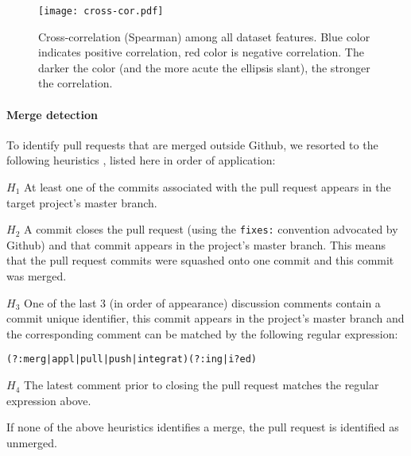 \documentclass{sig-alternate}
\begin{document}
\begin{figure}
  \begin{center}
    \texttt{[image: cross-cor.pdf]}
  \end{center}
  \caption{Cross-correlation (Spearman) among all dataset features. Blue color indicates positive correlation, red color is negative correlation. The darker
  the color (and the more acute the ellipsis slant), the stronger the correlation.}
  \label{fig:features}
\end{figure}



\paragraph*{Merge detection}
To identify pull requests that are merged outside Github, we resorted to
the following heuristics , listed here in order of application:

\begin{compactdesc}

  \item[$H_1$] At least one of the commits associated with the pull request appears in the target project's master branch.

  \item[$H_2$] A commit closes the pull request (using the \texttt{fixes:}
    convention advocated by Github) and that commit appears in the project's
    master branch.  This means that the pull request commits were squashed onto
    one commit and this commit was merged.

  \item[$H_3$] One of the last 3 (in order of appearance) discussion comments
    contain a commit unique identifier, this commit appears in the project's
    master branch and the corresponding comment can be matched by the following
    regular expression:

    \begin{small}
    \texttt{(?:merg|appl|pull|push|integrat)(?:ing|i?ed)}
    \end{small}

  \item[$H_4$] The latest comment prior to closing the pull request matches the
    regular expression above.

\end{compactdesc}

If none of the above heuristics identifies a merge, the pull request is
identified as unmerged.
\end{document}
